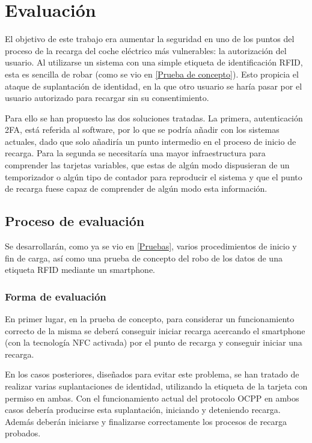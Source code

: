 \documentclass[12pt,a4paper,onecolumn,oneside]{report}
\begin{document}
\chapter{Evaluación}
\label{Evaluación}

El objetivo de este trabajo era aumentar la seguridad en uno de los puntos del proceso de la recarga del coche eléctrico más vulnerables: la autorización del usuario. Al utilizarse un sistema con una simple etiqueta de identificación RFID, esta es sencilla de robar (como se vio en \ref{Prueba de concepto}). Esto propicia el ataque de suplantación de identidad, en la que otro usuario se haría pasar por el usuario autorizado para recargar sin su consentimiento.

Para ello se han propuesto las dos soluciones tratadas. La primera, autenticación 2FA, está referida al software, por lo que se podría añadir con los sistemas actuales, dado que solo añadiría un punto intermedio en el proceso de inicio de recarga. Para la segunda se necesitaría una mayor infraestructura para comprender las tarjetas variables,  que estas de algún modo dispusieran de un temporizador o algún tipo de contador para reproducir el sistema y que el punto de recarga fuese capaz de comprender de algún modo esta información.

\section{Proceso de evaluación}

Se desarrollarán, como ya se vio en \ref{Pruebas}, varios procedimientos de inicio y fin de carga, así como una prueba de concepto del robo de los datos de una etiqueta RFID mediante un smartphone.

\subsection{Forma de evaluación}

En primer lugar, en la prueba de concepto, para considerar un funcionamiento correcto de la misma se deberá conseguir iniciar recarga acercando el smartphone (con la tecnología NFC activada) por el punto de recarga y conseguir iniciar una recarga.

En los casos posteriores, diseñados para evitar este problema, se han tratado de realizar varias suplantaciones de identidad, utilizando la etiqueta de la tarjeta con permiso en ambas. Con el funcionamiento actual del protocolo OCPP en ambos casos debería producirse esta suplantación, iniciando y deteniendo recarga. Además deberán iniciarse y finalizarse correctamente los procesos de recarga probados.
\end{document}
